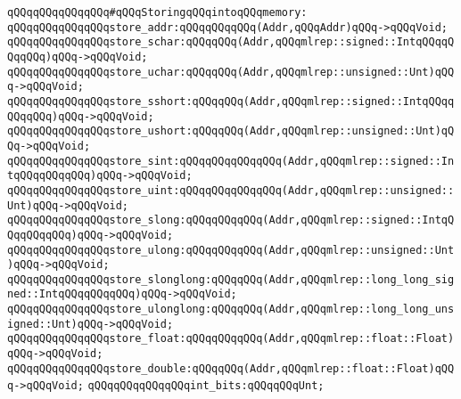 \newline
\newline
\verb|qQQqqQQqqQQqqQQq#qQQqStoringqQQqintoqQQqmemory:|\newline
\newline
\verb|qQQqqQQqqQQqqQQqstore_addr:qQQqqQQqqQQq(Addr,qQQqAddr)qQQq->qQQqVoid;|\newline
\newline
\verb|qQQqqQQqqQQqqQQqstore_schar:qQQqqQQq(Addr,qQQqmlrep::signed::IntqQQqqQQqqQQq)qQQq->qQQqVoid;|\newline
\verb|qQQqqQQqqQQqqQQqstore_uchar:qQQqqQQq(Addr,qQQqmlrep::unsigned::Unt)qQQq->qQQqVoid;|\newline
\newline
\verb|qQQqqQQqqQQqqQQqstore_sshort:qQQqqQQq(Addr,qQQqmlrep::signed::IntqQQqqQQqqQQq)qQQq->qQQqVoid;|\newline
\verb|qQQqqQQqqQQqqQQqstore_ushort:qQQqqQQq(Addr,qQQqmlrep::unsigned::Unt)qQQq->qQQqVoid;|\newline
\newline
\verb|qQQqqQQqqQQqqQQqstore_sint:qQQqqQQqqQQqqQQq(Addr,qQQqmlrep::signed::IntqQQqqQQqqQQq)qQQq->qQQqVoid;|\newline
\verb|qQQqqQQqqQQqqQQqstore_uint:qQQqqQQqqQQqqQQq(Addr,qQQqmlrep::unsigned::Unt)qQQq->qQQqVoid;|\newline
\newline
\verb|qQQqqQQqqQQqqQQqstore_slong:qQQqqQQqqQQq(Addr,qQQqmlrep::signed::IntqQQqqQQqqQQq)qQQq->qQQqVoid;|\newline
\verb|qQQqqQQqqQQqqQQqstore_ulong:qQQqqQQqqQQq(Addr,qQQqmlrep::unsigned::Unt)qQQq->qQQqVoid;|\newline
\newline
\verb|qQQqqQQqqQQqqQQqstore_slonglong:qQQqqQQq(Addr,qQQqmlrep::long_long_signed::IntqQQqqQQqqQQq)qQQq->qQQqVoid;|\newline
\verb|qQQqqQQqqQQqqQQqstore_ulonglong:qQQqqQQq(Addr,qQQqmlrep::long_long_unsigned::Unt)qQQq->qQQqVoid;|\newline
\newline
\verb|qQQqqQQqqQQqqQQqstore_float:qQQqqQQqqQQq(Addr,qQQqmlrep::float::Float)qQQq->qQQqVoid;|\newline
\verb|qQQqqQQqqQQqqQQqstore_double:qQQqqQQq(Addr,qQQqmlrep::float::Float)qQQq->qQQqVoid;|\newline
\newline
\verb|qQQqqQQqqQQqqQQqint_bits:qQQqqQQqUnt;|\newline
\newline
